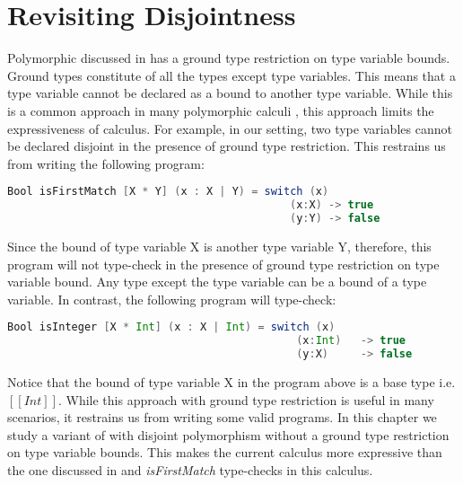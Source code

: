 
\chapter{Revisiting Disjointness}
\label{chap:disjointness}

Polymorphic \name discussed in 
 has a ground
type restriction on type variable bounds. Ground types 
constitute of all the types
except type variables. This means that a type variable 
cannot be declared as a bound to another type variable.
While this is a common approach in many polymorphic 
calculi \citep{dolan2017polymorphism},
this approach limits the expressiveness of calculus.
For example, in our setting, two type variables
cannot be declared disjoint in the presence of ground type restriction.
This restrains us from writing the following program:

\begin{lstlisting}[language=Scala]
  Bool isFirstMatch [X * Y] (x : X | Y) = switch (x)
                                            (x:X) -> true
                                            (y:Y) -> false
\end{lstlisting}

\noindent Since the bound of type variable X is another type variable
Y, therefore, this program will not type-check in the presence of
ground type restriction on type variable bound. Any type except
the type variable can be a bound of a type variable. 
In contrast, the following program will type-check:

\begin{lstlisting}[language=Scala]
  Bool isInteger [X * Int] (x : X | Int) = switch (x)
                                             (x:Int)   -> true
                                             (y:X)     -> false
\end{lstlisting}


\noindent Notice that the bound of type variable X in the program above
is a base type i.e. $[[Int]]$.
While this approach with ground type restriction is useful in many
scenarios, it restrains us from writing some valid programs.
In this chapter we study a variant of
\name with disjoint polymorphism without a ground type restriction on 
type variable bounds. This makes the current calculus more
expressive than the one discussed in 
and \emph{isFirstMatch} type-checks in this calculus.

